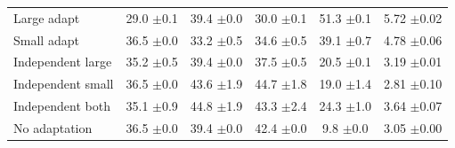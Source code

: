 \begin{table}[t]
\begin{tabular}{lccccc}
        Large adapt & 29.0 {\scriptsize$\pm$0.1} & 39.4 {\scriptsize$\pm$0.0} & 30.0 {\scriptsize$\pm$0.1} & 51.3 {\scriptsize$\pm$0.1} & 5.72 {\scriptsize$\pm$0.02} \\
        Small adapt & 36.5 {\scriptsize$\pm$0.0} & 33.2 {\scriptsize$\pm$0.5} & 34.6 {\scriptsize$\pm$0.5} & 39.1 {\scriptsize$\pm$0.7} & 4.78 {\scriptsize$\pm$0.06} \\
        \midrule
        Independent large & 35.2 {\scriptsize$\pm$0.5} & 39.4 {\scriptsize$\pm$0.0} & 37.5 {\scriptsize$\pm$0.5} & 20.5 {\scriptsize$\pm$0.1} & 3.19 {\scriptsize$\pm$0.01} \\
        Independent small & 36.5 {\scriptsize$\pm$0.0} & 43.6 {\scriptsize$\pm$1.9} & 44.7 {\scriptsize$\pm$1.8} & 19.0 {\scriptsize$\pm$1.4} & 2.81 {\scriptsize$\pm$0.10} \\
        Independent both & 35.1 {\scriptsize$\pm$0.9} & 44.8 {\scriptsize$\pm$1.9} & 43.3 {\scriptsize$\pm$2.4} & 24.3 {\scriptsize$\pm$1.0} & 3.64 {\scriptsize$\pm$0.07} \\
        \midrule
        No adaptation & 36.5 {\scriptsize$\pm$0.0} & 39.4 {\scriptsize$\pm$0.0} & 42.4 {\scriptsize$\pm$0.0} & 9.8 {\scriptsize$\pm$0.0} & 3.05 {\scriptsize$\pm$0.00} \\
        \bottomrule
    \end{tabular}
\end{table}
